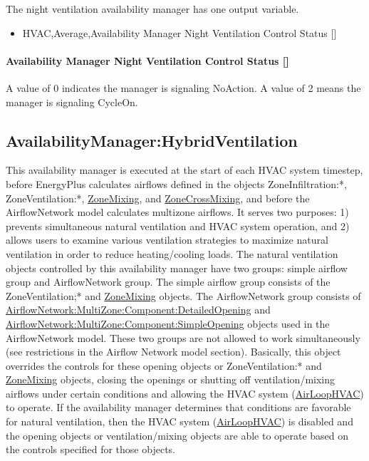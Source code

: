 The night ventilation availability manager has one output variable.

\begin{itemize}
\tightlist
\item
  HVAC,Average,Availability Manager Night Ventilation Control Status {[]}
\end{itemize}

\paragraph{Availability Manager Night Ventilation Control Status {[]}}\label{availability-manager-night-ventilation-control-status}

A value of 0 indicates the manager is signaling NoAction. A value of 2 means the manager is signaling CycleOn.

\subsection{AvailabilityManager:HybridVentilation}\label{availabilitymanagerhybridventilation}

This availability manager is executed at the start of each HVAC system timestep, before EnergyPlus calculates airflows defined in the objects ZoneInfiltration:*, ZoneVentilation:*, \hyperref[zonemixing]{ZoneMixing}, and \hyperref[zonecrossmixing]{ZoneCrossMixing}, and before the AirflowNetwork model calculates multizone airflows. It serves two purposes: 1) prevents simultaneous natural ventilation and HVAC system operation, and 2) allows users to examine various ventilation strategies to maximize natural ventilation in order to reduce heating/cooling loads. The natural ventilation objects controlled by this availability manager have two groups: simple airflow group and AirflowNetwork group. The simple airflow group consists of the ZoneVentilation;* and \hyperref[zonemixing]{ZoneMixing} objects. The AirflowNetwork group consists of \hyperref[airflownetworkmultizonecomponentdetailedopening]{AirflowNetwork:MultiZone:Component:DetailedOpening} and \hyperref[airflownetworkmultizonecomponentsimpleopening]{AirflowNetwork:MultiZone:Component:SimpleOpening} objects used in the AirflowNetwork model. These two groups are not allowed to work simultaneously (see restrictions in the Airflow Network model section). Basically, this object overrides the controls for these opening objects or ZoneVentilation:* and \hyperref[zonemixing]{ZoneMixing} objects, closing the openings or shutting off ventilation/mixing airflows under certain conditions and allowing the HVAC system (\hyperref[airloophvac]{AirLoopHVAC}) to operate. If the availability manager determines that conditions are favorable for natural ventilation, then the HVAC system (\hyperref[airloophvac]{AirLoopHVAC}) is disabled and the opening objects or ventilation/mixing objects are able to operate based on the controls specified for those objects.

